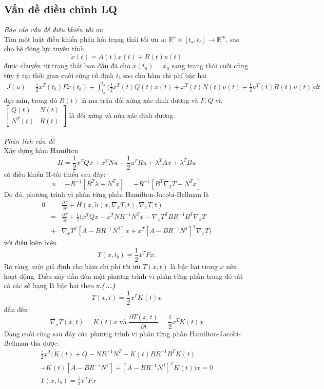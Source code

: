 \documentclass[12pt,a4paper]{report}
\begin{document}
	\subsection{Vấn đề điều chỉnh LQ}
	\textit{Báo cáo vấn đề điều khiển tối ưu}\\
	Tìm một luật điều khiển phản hồi trạng thái tối ưu $u$: $\mathbb{R}^n \times [t_a, t_b] \to \mathbb{R}^m$, sao cho hệ động lực tuyến tính $$\dot{x}(t)=A(t)x(t) + B(t)u(t)$$ được chuyển từ trạng thái ban đầu đã cho $x(t_a) = x_a$ sang trạng thái cuối cùng tùy ý tại  thời gian cuối cùng cố định $t_b$ sao cho hàm chi phí bậc hai
	\begin{eqnarray}
		J(u) =  \frac{1}{2}x^T(t_b)Fx(t_b) + \int_{t_a}^{t_b}\Big(\frac{1}{2}x^T(t)Q(t)x(t) + x^T(t)N(t)u(t) + \frac{1}{2}u^T(t)R(t)u(t)\Big)dt \nonumber
	\end{eqnarray} đạt min, trong đó $R(t)$ là ma trận đối xứng xác định dương và $F, Q$ và $\begin{bmatrix}
		Q(t)&N(t)\\N^T(t)&R(t)
	\end{bmatrix}$ là đối xứng và nửa xác định dương.\\\\
	\textit{Phân tích vấn đề}
	\\Xây dựng hàm Hamilton $$H = \frac{1}{2}x^TQx + x^TNu + \frac{1}{2}u^TRu + \lambda^TAx + \lambda^TBu$$ có điều khiển H-tối thiểu sau đây: $$u = -R^{-1}[B^T\lambda + N^Tx] = -R^{-1}[B^T\nabla_xT + N^Tx]$$ Do đó, phương trình vi phân từng phần Hamilton-Jacobi-Bellman là
	\begin{eqnarray}
		0 &=& \frac{\partial T}{\partial t} + H(x, \tilde{u}(x, \nabla_xT,t),\nabla_xT,t) \nonumber \\ &=& \frac{\partial T}{\partial t} + \frac{1}{2}\Big(x^TQx-x^TNR^{-1}N^Tx-\nabla_xT^TBR^{-1}B^T\nabla_xT \nonumber \\ &+& \nabla_xT^T[A-BR^{-1}N^T]x+x^T[A-BR^{-1}N^T]^T\nabla_xT\Big) \nonumber
	\end{eqnarray} với điều kiện biên $$T(x, t_b) = \frac{1}{2}x^TFx.$$
	Rõ ràng, một giả định cho hàm chi phí tối ưu $T(x, t)$ là bậc hai trong $x$ nên hoạt động. Điều này dẫn đến một phương trình vi phân từng phần trong đó tất cả các số hạng là bậc hai theo x.\textit{\textbf{(...)}} $$T(x, t) = \frac{1}{2}x^TK(t)x$$ dẫn đến $$\nabla_xT(x, t) = K(t)x \text{ và } \frac{\partial T(x, t)}{\partial t} = \frac{1}{2}x^T \dot{K}(t)x$$ Dạng cuối cùng sau đây của phương trình vi phân từng phần Hamilton-Jacobi-Bellman thu được:
	\begin{eqnarray}
		\frac{1}{2}x^T \Big(\dot{K}(t) + Q - NR^{-1}N^T - K(t)BR^{-1}B^TK(t) \nonumber \\ + K(t)[A-BR^{-1}N^T] + [A - BR^{-1}N^T]^TK(t)\Big)x = 0 \nonumber\\
		T(x, t_b) = \frac{1}{2}x^TFx \nonumber
	\end{eqnarray}
\end{document}
